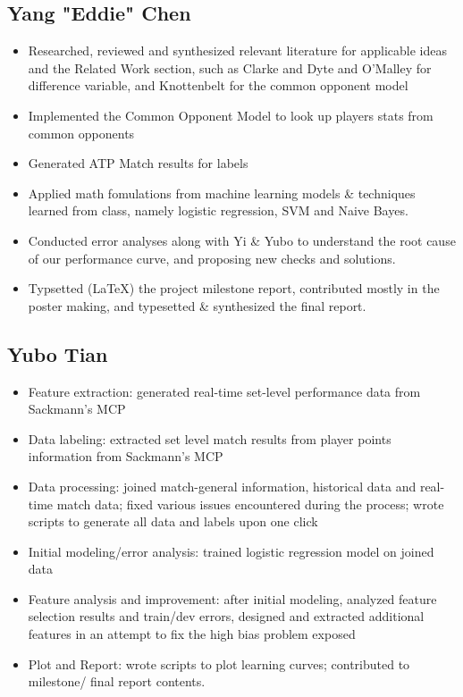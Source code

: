 \documentclass[paper=a4, fontsize=10pt]{scrartcl} %
\numberwithin{equation}{section} %
\numberwithin{figure}{section} %
\numberwithin{table}{section} %
\begin{document}
\subsection{Yang "Eddie" Chen}
\begin{itemize}
\item Researched, reviewed and synthesized relevant literature for applicable ideas and the Related Work section, such as Clarke and Dyte \cite{Clarke2010} and O'Malley \cite{omalley} for difference variable, and Knottenbelt \cite{KNOTTENBELT20123820} for the common opponent model
\item Implemented the Common Opponent Model to look up players stats from common opponents
\item Generated ATP Match results for labels
\item Applied math fomulations from machine learning models \& techniques learned from class, namely logistic regression, SVM and Naive Bayes. 
\item Conducted error analyses along with Yi \& Yubo to understand the root cause of our performance curve, and proposing new checks and solutions. 
\item Typsetted (\LaTeX) the project milestone report, contributed mostly in the poster making, and typesetted \& synthesized the final report. 
\end{itemize}

\subsection{Yubo Tian}
\begin{itemize}
\item Feature extraction: generated real-time set-level performance data from Sackmann's MCP \cite{tennis_charting}
\item Data labeling: extracted set level match results from player points information from Sackmann's MCP \cite{tennis_charting}
\item Data processing: joined match-general information, historical data and real-time match data; fixed various issues encountered during the process; wrote scripts to generate all data and labels upon one click
\item Initial modeling/error analysis: trained logistic regression model on joined data
\item Feature analysis and improvement: after initial modeling, analyzed feature selection results and train/dev errors, designed and extracted additional features in an attempt to fix the high bias problem exposed
\item Plot and Report: wrote scripts to plot learning curves; contributed to milestone/ final report contents.
\end{itemize}
\end{document}
